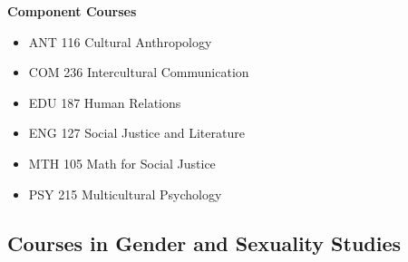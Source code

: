 \documentclass[
  letterpaper,
]{scrbook}
\providecommand{\tightlist}{%
  \setlength{\itemsep}{0pt}\setlength{\parskip}{0pt}}
\begin{document}
\begin{enumerate}
  \textbf{Component Courses}

  \begin{itemize}
  \tightlist
  \item
    ANT 116 Cultural Anthropology\\
  \item
    COM 236 Intercultural Communication\\
  \item
    EDU 187 Human Relations\\
  \item
    ENG 127 Social Justice and Literature\\
  \item
    MTH 105 Math for Social Justice\\
  \item
    PSY 215 Multicultural Psychology
  \end{itemize}
\end{enumerate}

\subsection{Courses in Gender and Sexuality
Studies}\label{courses-in-gender-and-sexuality-studies}
\end{document}
